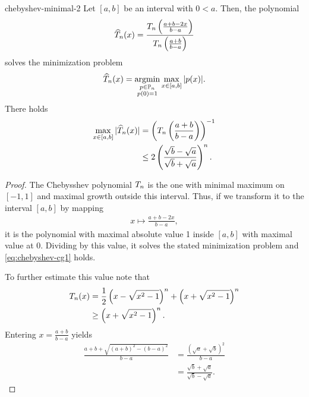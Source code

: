 \begin{Corollary}{chebyshev-minimal-2}
  Let $[a,b]$ be an interval with $0 < a$. Then, the polynomial
  \begin{gather}
    \widehat \pchebyshev_n(x)
    = \frac{\pchebyshev_n\left(\frac{a+b-2x}{b-a}\right)}%
    {\pchebyshev_n\left(\frac{a+b}{b-a}\right)}
  \end{gather}
  solves the minimization problem
  \begin{gather}
    \widehat {T}_n(x)
    = \operatorname*{argmin}_{\substack{p\in\mathbb P_n\\p(0) = 1}}
    \max_{x\in[a,b]}{\lvert p(x)\rvert}.
  \end{gather}
  There holds
  \begin{align}
    \label{eq:chebyshev-cg1}
    \max_{x\in[a,b]}{\lvert\widehat {T}_n(x)\rvert}
    &= \left(T_n\left(\frac{a+b}{b-a}\right)\right)^{-1}\\
    & \le 2 \left(\frac{\sqrt b-\sqrt a}{\sqrt b + \sqrt a}\right)^n.
  \end{align}
\end{Corollary}

\begin{proof}
  The Chebysshev polynomial $T_n$ is the one with minimal maximum on $[-1,1]$ and maximal growth outside this interval. Thus, if we transform it to the interval $[a,b]$ by mapping
  \begin{gather}
    x \mapsto \frac{a+b-2x}{b-a},
  \end{gather}
  it is the polynomial with maximal absolute value 1 inside $[a,b]$
  with maximal value at 0. Dividing by this value, it solves the
  stated minimization problem and \eqref{eq:chebyshev-cg1} holds.

  To further estimate this value note that
  \begin{align}
    T_n(x)
    &= \frac12
      \left(x-\sqrt{x^2-1}\right)^n
      +
      \left(x+\sqrt{x^2-1}\right)^n\\
    &\ge \left(x+\sqrt{x^2-1}\right)^n.
  \end{align}
  Entering $x = \frac{a+b}{b-a}$ yields
  \begin{align}
    \frac{a+b+\sqrt{(a+b)^2-(b-a)^2}}{b-a}
    &= \frac{(\sqrt a + \sqrt b)^2}{b-a}\\
    &= \frac{\sqrt b + \sqrt a}{\sqrt b-\sqrt a}.
  \end{align}
\end{proof}

